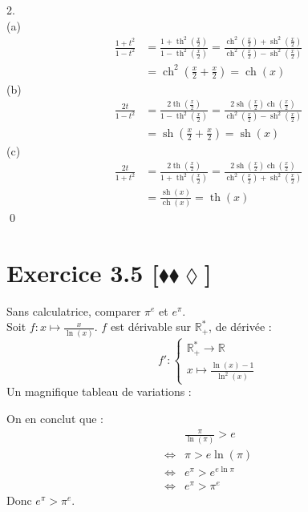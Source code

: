 \documentclass[10pt]{article}
\DeclareMathOperator{\ch}{ch}
\DeclareMathOperator{\sh}{sh}
\DeclareMathOperator{\tah}{th}
\begin{document}
\begin{tcolorbox}[enhanced, width=7in, center, size=fbox, fontupper=\large, drop shadow southwest]
    2.\\
    (a)
    \begin{align*}
        \frac{1+t^2}{1-t^2}&=\frac{1+\tah^2(\frac{x}{2})}{1-\tah^2(\frac{x}{2})}=\frac{\ch^2(\frac{x}{2})+\sh^2(\frac{x}{2})}{\ch^2(\frac{x}{2})-\sh^2(\frac{x}{2})}\\
        &=\ch^2\left(\frac{x}{2}+\frac{x}{2}\right)=\ch(x)
    \end{align*}
    (b)
    \begin{align*}
        \frac{2t}{1-t^2}&=\frac{2\tah(\frac{x}{2})}{1-\tah^2(\frac{x}{2})}=\frac{2\sh(\frac{x}{2})\ch(\frac{x}{2})}{\ch^2(\frac{x}{2})-\sh^2(\frac{x}{2})}\\
        &=\sh\left(\frac{x}{2}+\frac{x}{2}\right)=\sh(x)
    \end{align*}
    (c)
    \begin{align*}
        \frac{2t}{1+t^2}&=\frac{2\tah(\frac{x}{2})}{1+\tah^2(\frac{x}{2})}=\frac{2\sh(\frac{x}{2})\ch(\frac{x}{2})}{\ch^2(\frac{x}{2})+\sh^2(\frac{x}{2})}\\
        &=\frac{\sh(x)}{\ch(x)}=\tah(x)
    \end{align*}
    \qed
\end{tcolorbox}

\section*{Exercice 3.5 [$\blacklozenge\blacklozenge\lozenge$]}
\begin{tcolorbox}[enhanced, width=6in, center, size=fbox, fontupper=\large, drop shadow southwest]
    Sans calculatrice, comparer $\pi^e$ et $e^\pi$.\\
    Soit $f:x\mapsto\frac{x}{\ln(x)}$. $f$ est dérivable sur $\mathbb{R}^*_+$, de dérivée :
    \begin{equation*}
        f':\begin{cases}\mathbb{R}^*_+\rightarrow\mathbb{R}\\x\mapsto\frac{\ln(x)-1}{\ln^2(x)}\end{cases}
    \end{equation*}
    Un magnifique tableau de variations :
    \begin{center}
    \end{center}
    On en conclut que :
    \begin{align*}
        &\frac{\pi}{\ln(\pi)}>e\\
        \iff&\pi>e\ln(\pi)\\
        \iff&e^\pi>e^{e\ln{\pi}}\\
        \iff&e^\pi>\pi^e
    \end{align*}
    Donc $e^\pi>\pi^e$.
\end{tcolorbox}
\end{document}
